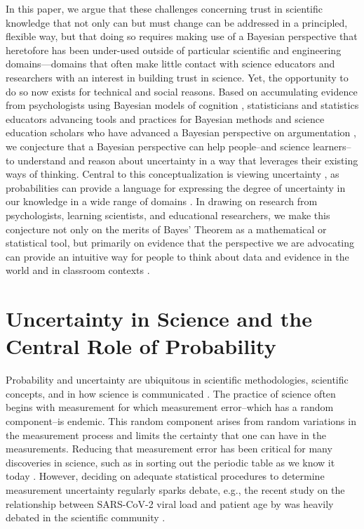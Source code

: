 \documentclass[man]{apa7}
\begin{document}
In this paper, we argue that these challenges concerning trust in scientific knowledge that not only can but must change can be addressed in a principled, flexible way, but that doing so requires making use of a Bayesian perspective that heretofore has been under-used outside of particular scientific and engineering domains---domains that often make little contact with science educators and researchers with an interest in building trust in science. Yet, the opportunity to do so now exists for technical and social reasons. Based on accumulating evidence from psychologists using Bayesian models of cognition \parencite{g12, tgk06}, statisticians and statistics educators advancing tools and practices for Bayesian methods \parencite{a02, b02, h_a20, h_j20,me14, s07} and science education scholars who have advanced a Bayesian perspective on argumentation \parencite{n11, s07}, we conjecture that a Bayesian perspective can help people--and science learners--to understand and reason about uncertainty in a way that leverages their existing ways of thinking. Central to this conceptualization is viewing uncertainty , as probabilities can provide a language for expressing the degree of uncertainty in our knowledge in a wide range of domains \parencite{g12}. In drawing on research from psychologists, learning scientists, and educational researchers, we make this conjecture not only on the merits of Bayes' Theorem as a mathematical or statistical tool, but primarily on evidence that the perspective we are advocating can provide an intuitive way for people to think about data and evidence in the world \parencite{g12} and in classroom contexts \parencite{ll20, n11, s07, so12, w17}.

\section{Uncertainty in Science and the Central Role of Probability}

Probability and uncertainty are ubiquitous in scientific methodologies, scientific concepts, and in how science is communicated \textcite{gsoobmc17}. The practice of science often begins with measurement for which measurement error--which has a random component--is endemic. This random component arises from random variations in the measurement process and limits the certainty that one can have in the measurements. Reducing that measurement error has been critical for many discoveries in science, such as in sorting out the periodic table as we know it today \parencite{fco15}. However, deciding on adequate statistical procedures to determine measurement uncertainty regularly sparks debate, e.g., the recent study on the relationship between SARS-CoV-2 viral load and patient age by \textcite{jmvbzhd20} was heavily debated in the scientific community \parencite{frick_peer-review_2020}.
\end{document}
